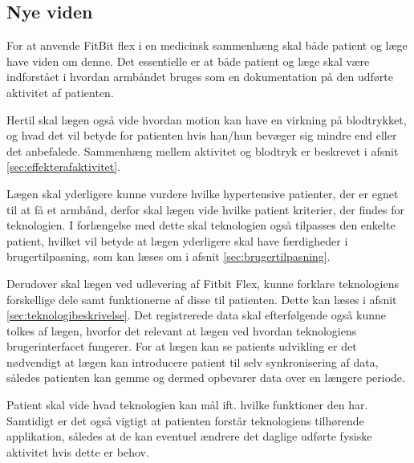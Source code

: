 \subsection{Nye viden}

For at anvende FitBit flex i en medicinsk sammenhæng skal både patient og læge have viden om denne. Det essentielle er at både patient og læge skal være indforstået i hvordan armbåndet bruges som en dokumentation på den udførte aktivitet af patienten. 


Hertil skal lægen også vide hvordan motion kan have en virkning på blodtrykket, og hvad det vil betyde for patienten hvis han/hun bevæger sig mindre end eller det anbefalede. Sammenhæng mellem aktivitet og blodtryk er beskrevet i afsnit \ref{sec:effekterafaktivitet}.


Lægen skal yderligere kunne vurdere hvilke hypertensive patienter, der er egnet til at få et armbånd, derfor skal lægen vide hvilke patient kriterier, der findes for teknologien. I forlængelse med dette skal teknologien også tilpasses den enkelte patient, hvilket vil betyde at lægen yderligere skal have færdigheder i brugertilpasning, som kan læses om i afsnit \ref{sec:brugertilpasning}. 


Derudover skal lægen ved udlevering af Fitbit Flex, kunne forklare teknologiens forskellige dele samt funktionerne af disse til patienten. Dette kan læses i afsnit \ref{sec:teknologibeskrivelse}. Det registrerede data skal efterfølgende også kunne tolkes af lægen, hvorfor det relevant at lægen ved hvordan teknologiens brugerinterfacet fungerer. For at lægen kan se patients udvikling er det nødvendigt at lægen kan introducere patient til selv synkronisering af data, således patienten kan gemme og dermed opbevarer data over en længere periode. 


Patient skal vide hvad teknologien kan mål ift. hvilke funktioner den har. Samtidigt er det også vigtigt at patienten forstår teknologiens tilhørende applikation, således at de kan eventuel ændrere det daglige udførte fysiske aktivitet hvis dette er behov. 